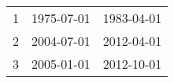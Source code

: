 % 
\begin{tabular}{ccc}
  \hline
  \hline
1 & 1975-07-01 & 1983-04-01 \\ 
  2 & 2004-07-01 & 2012-04-01 \\ 
  3 & 2005-01-01 & 2012-10-01 \\ 
   \hline
\end{tabular}
